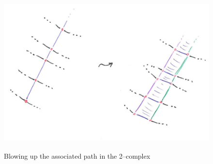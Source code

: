 \begin{figure}
	\centering
	\captionsetup{justification=centering}
	\caption{Blowing up the associated path in the 2--complex}
	\includegraphics[height=3in]{figures/edgeblowup2complex.jpg}
	\label{fig:edgeblowup2complex}
\end{figure}